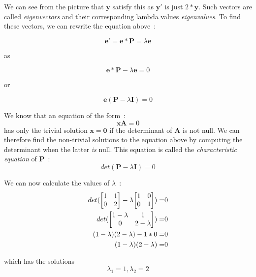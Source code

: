 \documentclass[11pt,twocolumn]{amsart} %
\newcommand{\ve}[1]{\boldsymbol{#1}}
\newcommand{\ma}[1]{\boldsymbol{#1}}
\newenvironment{m}{\begin{bmatrix}}{\end{bmatrix}}
\begin{document}
We can see from the picture that $\ve{y}$ satisfy this as $\ve{y'}$ is just $2 * \ve{y}$. Such vectors are called \emph{eigenvectors} and their corresponding lambda values \emph{eigenvalues}. To find these vectors, we can rewrite the equation above~:

\[
  \ve{e'} = \ve{e} * \ma{P} = \lambda \ve{e}
\]

as

\[
  \ve{e} * \ma{P} - \lambda \ve{e} = 0
\]

or 

\[
  \ve{e} (\ma{P} - \lambda \ma{I}) = 0  
\]

We know that an equation of the form~:
\[
  \ve{x} \ma{A} = 0
\]
has only the trivial solution $\ve{x} = \ve{0}$ if the determinant of $\ma{A}$ is not null. We can therefore find the non-trivial solutions to the equation above by computing the determinant when the latter \emph{is} null. This equation is called the \emph{characteristic equation} of $\ma{P}$~:
\[
  det(\ma{P} - \lambda \ma{I}) = 0
\]

We can now calculate the values of $\lambda$~:
\begin{align*}
  det(\begin{m} 1 & 1 \\ 0 & 2\end{m} - \lambda \begin{m} 1 & 0 \\ 0 & 1 \end{m}) = & 0 \\
  det(\begin{m} 1-\lambda & 1 \\ 0 & 2-\lambda\end{m}) = & 0 \\
  (1-\lambda)(2-\lambda) - 1 * 0 = & 0 \\
  (1-\lambda)(2-\lambda) = & 0
\end{align*}

which has the solutions
\[
\lambda_1 = 1, \lambda_2 = 2
\]
\end{document}
